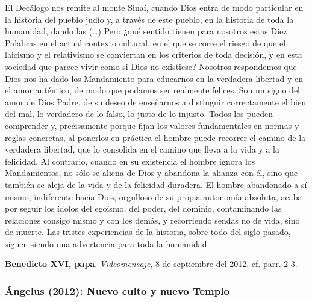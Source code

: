 \begin{patercite}
El Decálogo nos remite al monte Sinaí, cuando Dios entra de modo particular en la historia del pueblo judío y, a través de este pueblo, en la historia de toda la humanidad, dando las  (\ldots)  Pero ¿qué sentido tienen para nosotros estas Diez Palabras en el actual contexto cultural, en el que se corre el riesgo de que el laicismo y el relativismo se conviertan en los criterios de toda decisión, y en esta sociedad que parece vivir como si Dios no existiese? Nosotros respondemos que Dios nos ha dado los Mandamiento para educarnos en la verdadera libertad y en el amor auténtico, de modo que podamos ser realmente felices. Son un signo del amor de Dios Padre, de su deseo de enseñarnos a distinguir correctamente el bien del mal, lo verdadero de lo falso, lo justo de lo injusto. Todos los pueden comprender y, precisamente porque fijan los valores fundamentales en normas y reglas concretas, al ponerlos en práctica el hombre puede recorrer el camino de la verdadera libertad, que lo consolida en el camino que lleva a la vida y a la felicidad. Al contrario, cuando en su existencia el hombre ignora los Mandamientos, no sólo se aliena de Dios y abandona la alianza con él, sino que también se aleja de la vida y de la felicidad duradera. El hombre abandonado a sí mismo, indiferente hacia Dios, orgulloso de su propia autonomía absoluta, acaba por seguir los ídolos del egoísmo, del poder, del dominio, contaminando las relaciones consigo mismo y con los demás, y recorriendo sendas no de vida, sino de muerte. Las tristes experiencias de la historia, sobre todo del siglo pasado, siguen siendo una advertencia para toda la humanidad.

\textbf{Benedicto XVI, papa}, \textit{Videomensaje},  8 de septiembre del 2012, cf. parr. 2-3.
\end{patercite}

\newpage
\subsubsection{Ángelus (2012): Nuevo culto y nuevo Templo}


